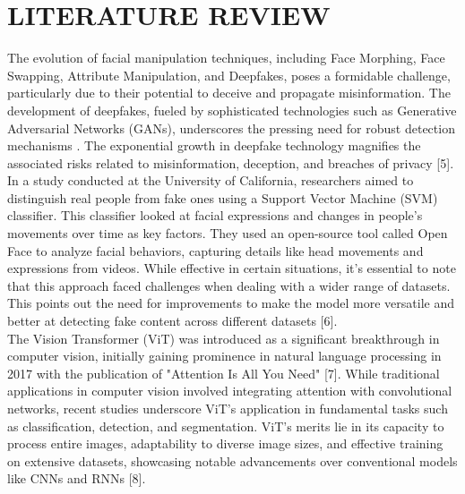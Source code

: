 \section{LITERATURE REVIEW}

The evolution of facial manipulation techniques, including Face Morphing, Face Swapping, Attribute Manipulation, and Deepfakes, poses a formidable challenge, particularly due to their potential to deceive and propagate misinformation. The development of deepfakes, fueled by sophisticated technologies such as Generative Adversarial Networks (GANs), underscores the pressing need for robust detection mechanisms . The exponential growth in deepfake technology magnifies the associated risks related to misinformation, deception, and breaches of privacy [5].\\

\noindent In a study conducted at the University of California, researchers aimed to distinguish real people from fake ones using a Support Vector Machine (SVM) classifier. This classifier looked at facial expressions and changes in people's movements over time as key factors. They used an open-source tool called Open Face to analyze facial behaviors, capturing details like head movements and expressions from videos. While effective in certain situations, it's essential to note that this approach faced challenges when dealing with a wider range of datasets. This points out the need for improvements to make the model more versatile and better at detecting fake content across different datasets [6].\\

\noindent The Vision Transformer (ViT) was introduced as a significant breakthrough in computer vision, initially gaining prominence in natural language processing in 2017 with the publication of "Attention Is All You Need" [7]. While traditional applications in computer vision involved integrating attention with convolutional networks, recent studies underscore ViT's application in fundamental tasks such as classification, detection, and segmentation. ViT's merits lie in its capacity to process entire images, adaptability to diverse image sizes, and effective training on extensive datasets, showcasing notable advancements over conventional models like CNNs and RNNs [8].\\

